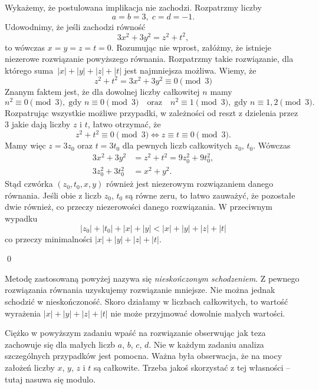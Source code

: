 \vspace{5px}


\noindent
Wykażemy, że postulowana implikacja nie zachodzi. Rozpatrzmy liczby
\[
	a = b = 3, \; c = d = -1.
\]
Udowodnimy, że jeśli zachodzi równość
\[
	3x^2 + 3y^2 = z^2 + t^2,
\]
to wówczas $x = y = z = t = 0$. Rozumując nie wprost, załóżmy, że istnieje niezerowe rozwiązanie powyższego równania. Rozpatrzmy takie rozwiązanie, dla którego suma~${|x| + |y| + |z| + |t|}$ jest najmniejsza możliwa. Wiemy, że
\[
	z^2 + t^2 = 3x^2 + 3y^2 \equiv 0 \pmod{3}
\]
Znanym faktem jest, że dla dowolnej liczby całkowitej $n$ mamy
\[
	n^2 \equiv 0 \pmod{3},\; \text{gdy } n \equiv 0 \pmod{3} \quad \text{oraz} \quad n^2 \equiv 1 \pmod{3},\; \text{gdy } n \equiv 1, 2 \pmod{3}.
\]
Rozpatrując wszystkie możliwe przypadki, w zależności od reszt z dzielenia przez $3$ jakie dają liczby $z$ i $t$, łatwo otrzymać, że
\[
	z^2 + t^2  \equiv 0 \pmod{3} \iff z \equiv t \equiv 0 \pmod{3}.
\]
Mamy więc $z = 3z_0$ oraz $t = 3t_0$ dla pewnych liczb całkowitych $z_0$,\; $t_0$. Wówczas
\begin{align*}
	3x^2 + 3y^2 &= z^2 + t^2 = 9z_0^2 + 9t_0^2, \\
	3z_0^2 + 3t_0^2 &= x^2 + y^2.
\end{align*}
Stąd czwórka $(z_0, t_0, x, y)$ również jest niezerowym rozwiązaniem danego równania. Jeśli obie z liczb $z_0$, $t_0$ są równe zeru, to łatwo zauważyć, że pozostałe dwie również, co przeczy niezerowości danego rozwiązania. W przeciwnym wypadku
\[
	|z_0| + |t_0| + |x| + |y| < |x| + |y| + |z| + |t|
\]
co przeczy minimalności $|x| + |y| + |z| + |t|$.

\qed

\noindent
Metodę zastosowaną powyżej nazywa się \textit{nieskończonym schodzeniem}. Z pewnego rozwiązania równania uzyskujemy rozwiązanie mniejsze. Nie można jednak schodzić w nieskończoność. Skoro działamy w liczbach całkowitych, to wartość wyrażenia ${|x| + |y| + |z| + |t|}$ nie może przyjmować dowolnie małych wartości.

\vspace{10px}
\noindent
Ciężko w powyższym zadaniu wpaść na rozwiązanie obserwując jak teza zachowuje się dla małych liczb $a$, $b$, $c$, $d$. Nie w każdym zadaniu analiza szczególnych przypadków jest pomocna. Ważna była obserwacja, że na mocy założeń liczby $x$, $y$, $z$ i $t$ są całkowite. Trzeba jakoś skorzystać z tej własności -- tutaj nasuwa się modulo.

\vspace{10px}